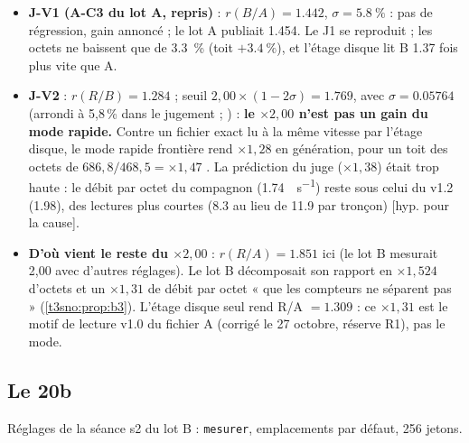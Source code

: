 \begin{itemize}
\item \textbf{J-V1 (A-C3 du lot A, repris)} : $r(B/A) = \num{1.442}$, $\sigma = \SI{5.8}{\percent}$ : pas de régression, gain annoncé ; le lot A publiait \num{1.454}. Le J1 se reproduit ; les octets ne baissent que de \SI{3.3}{\percent} (toit $+\SI{3.4}{\percent}$), et l'étage disque lit B \num{1.37} fois plus vite que A.
\item \textbf{J-V2} : $r(R/B) = \num{1.284}$ ; seuil $2{,}00 \times (1 - 2\sigma) = \num{1.769}$, avec $\sigma = \num{0.05764}$ (arrondi à 5,8\,\% dans le jugement ; ) : \textbf{le $\times 2{,}00$ n'est pas un gain du mode rapide.} Contre un fichier exact lu à la même vitesse par l'étage disque, le mode rapide frontière rend $\times 1{,}28$ en génération, pour un toit des octets de $686{,}8/468{,}5 = \times 1{,}47$ \calc. La prédiction du juge ($\times 1{,}38$) était trop haute : le débit par octet du compagnon (\SI{1.74}{\Go\per\second}) reste sous celui du v1.2 (\num{1.98}), des lectures plus courtes (\SI{8.3}{\Mo} au lieu de \num{11.9} par tronçon) [hyp. pour la cause].
\item \textbf{D'où vient le reste du $\times 2{,}00$} : $r(R/A) = \num{1.851}$ ici (le lot B mesurait 2,00 avec d'autres réglages). Le lot B décomposait son rapport en $\times 1{,}524$ d'octets et un $\times 1{,}31$ de débit par octet « que les compteurs ne séparent pas » (\cref{t3sno:prop:b3}). L'étage disque seul rend R/A $= \num{1.309}$ : ce $\times 1{,}31$ est  le motif de lecture v1.0 du fichier A (corrigé le 27 octobre, réserve R1), pas le mode.
\end{itemize}

\subsection{Le 20b}\label{t3jug:sec:v20}

Réglages de la séance s2 du lot B : \texttt{mesurer}, emplacements par défaut, 256 jetons.

